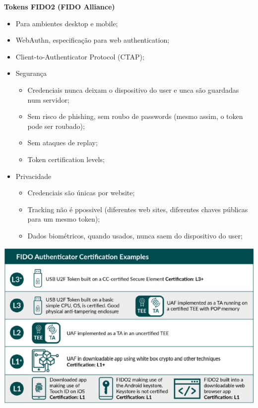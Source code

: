 \documentclass{article}
\begin{document}
\begin{flushleft}
  \textbf{Tokens FIDO2 (FIDO Alliance)}
  \begin{itemize}
    \item Para ambientes desktop e mobile;
    \item WebAuthn, especificação para web authentication;
    \item Client-to-Authenticator Protocol (CTAP);
    \item Segurança
    \begin{itemize}
      \item Credenciais nunca deixam o dispositivo do user e unca são guardadas num servidor;
      \item Sem risco de phishing, sem roubo de passwords (mesmo assim, o token pode ser roubado);
      \item Sem ataques de replay;
      \item Token certification levels;
    \end{itemize}
    \item Privacidade
    \begin{itemize}
      \item Credenciais são únicas por website;
      \item Tracking não é ppossivel (diferentes web sites, diferentes chaves públicas para um mesmo token);
      \item Dados biométricos, quando usados, nunca saem do dispositivo do user;
    \end{itemize}
  \end{itemize}
\end{flushleft}

\begin{center}
  \includegraphics[scale=0.6]{23}
\end{center}
\end{document}

